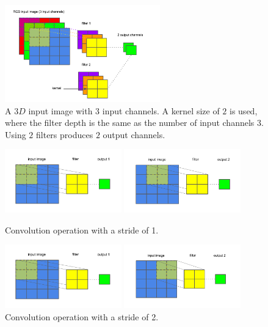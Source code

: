 \begin{figure}[H]
   	\centering
    	\includegraphics[width=0.6\textwidth, height=0.3\textwidth]{channels}
	\captionsetup{justification=centering}
	\caption{A $ 3D $ input image with 3 input channels. A kernel size of $ 2 $ is used, where the filter depth is the same as the number of input channels $ 3 $. Using $ 2 $ filters produces $ 2 $ output channels.}
\end{figure}

\begin{figure}[H]
	\parbox{.5\linewidth}{
   		\centering
    		\includegraphics[width=0.45\textwidth, height=0.2\textwidth]{convolution1}
		}
	\hfill
	\parbox{.5\linewidth}{
   		\centering
    		\includegraphics[width=0.45\textwidth, height=0.2\textwidth]{convolution2}
		}
	\captionsetup{justification=centering}
	\caption{Convolution operation with a stride of 1.}
	
	\parbox{.5\linewidth}{
   		\centering
    		\includegraphics[width=0.45\textwidth, height=0.2\textwidth]{convolution1}
		}
	\hfill
	\parbox{.5\linewidth}{
   		\centering
    		\includegraphics[width=0.45\textwidth, height=0.2\textwidth]{stride_of_2}
		}
	\captionsetup{justification=centering}
	\caption{Convolution operation with a stride of 2.}
\end{figure}

